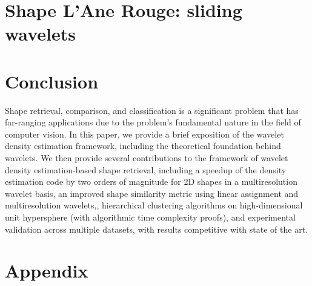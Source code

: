 \documentclass{article}
\begin{document}
\part{Shape L'Ane Rouge: sliding wavelets}
  
  
  

\part{Conclusion}
  Shape retrieval, comparison, and classification is a significant problem that has far-ranging applications due to the problem's fundamental nature in the field of computer vision. In this paper, we provide a brief exposition of the wavelet density estimation framework, including the theoretical foundation behind wavelets. We then provide several contributions to the framework of wavelet density estimation-based shape retrieval, including a speedup of the density estimation code by two orders of magnitude for 2D shapes in a multiresolution wavelet basis, an improved shape similarity metric using linear assignment and multiresolution wavelets,, hierarchical clustering algorithms on high-dimensional unit hypersphere (with algorithmic time complexity proofs), and experimental validation across multiple datasets, with results competitive with state of the art.

\newpage



\part{Appendix}
  
\end{document}
